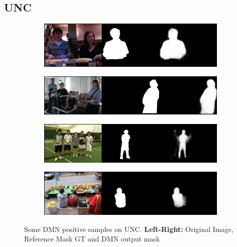 \subsection*{UNC}
\begin{figure}[!htbp]
    \centering
    \begin{subfigure}[b]{\columnwidth}
            \centering
            \includegraphics[width=\textwidth]{./figures/unc_samples/1.png}
    \end{subfigure}
    
    \begin{subfigure}[b]{\columnwidth}
            \centering
            \includegraphics[width=\textwidth]{./figures/unc_samples/2.png}
    \end{subfigure}
    
    \begin{subfigure}[b]{\columnwidth}
            \centering
            \includegraphics[width=\textwidth]{./figures/unc_samples/3.png}
    \end{subfigure}
    
    \begin{subfigure}[b]{\columnwidth}
            \centering
            \includegraphics[width=\textwidth]{./figures/unc_samples/4.png}
    \end{subfigure}
    \caption{Some DMN positive samples on UNC. \textbf{Left-Right:} Original Image, Reference Mask GT and DMN output mask}
    \label{Fig:UNC_Pos}
\end{figure}
